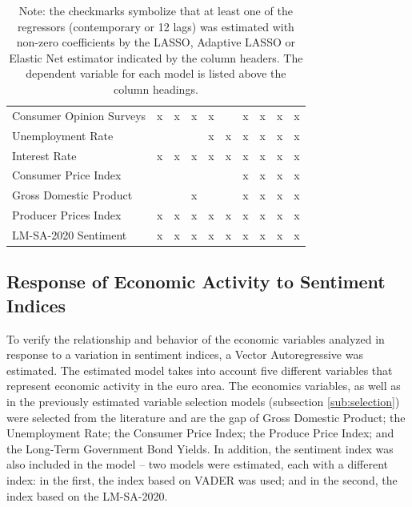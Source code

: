 \begin{landscape}
\begin{table}[]
\begin{adjustbox}{max width=\linewidth}
\begin{tabular}{llllllllll}
Consumer Opinion Surveys & x        & x                 & x             & x        &                  & x            & x       & x                & x            \\
Unemployment Rate        &          &                   &               & x        & x                & x            & x       & x                & x            \\
Interest Rate            & x        & x                 & x             & x        & x                & x            & x       & x                & x            \\
Consumer Price Index     &          &                   &               &          &                  & x            & x       & x                & x            \\
Gross Domestic Product   &          &                   & x             &          &                  & x            & x       & x                & x            \\
Producer Prices Index    & x        & x                 & x             & x        & x                & x            & x       & x                & x            \\ \hline
LM-SA-2020 Sentiment          & x        & x                 & x             & x        & x                & x            & x       & x                & x    \\ \hline     
\end{tabular}
\end{adjustbox}
\caption*{Note: the checkmarks symbolize that at least one of the regressors (contemporary or 12 lags) was estimated with non-zero coefficients by the LASSO, Adaptive LASSO or Elastic Net estimator indicated by the column headers. The dependent variable for each model is listed above the column headings.}
\end{table}
\end{landscape}

\subsection{Response of Economic Activity to Sentiment Indices}

To verify the relationship and behavior of the economic variables analyzed in response to a variation in sentiment indices, a Vector Autoregressive was estimated. The estimated model takes into account five different variables that represent economic activity in the euro area. The economics variables, as well as in the previously estimated variable selection models (subsection \ref{sub:selection}) were selected from the literature \cite{shapiro2020measuring, barsky2012information} and are the gap of Gross Domestic Product; the Unemployment Rate; the Consumer Price Index; the Produce Price Index; and the Long-Term Government Bond Yields. In addition, the sentiment index was also included in the model -- two models were estimated, each with a different index: in the first, the index based on VADER was used; and in the second, the index based on the LM-SA-2020.\\

